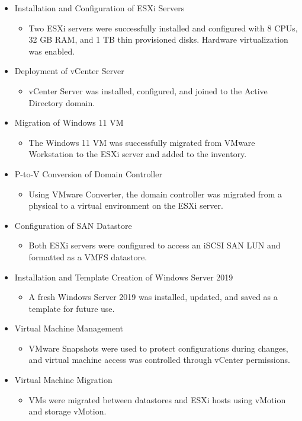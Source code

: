\documentclass[letterpaper]{article}
\begin{document}
\begin{itemize}
\item Installation and Configuration of ESXi Servers
\begin{itemize}
\item Two ESXi servers were successfully installed and configured with 8 CPUs, 32 GB RAM, and 1 TB thin provisioned disks. Hardware virtualization was enabled.
\end{itemize}
\item Deployment of vCenter Server
\begin{itemize}
\item vCenter Server was installed, configured, and joined to the Active Directory domain.
\end{itemize}
\item Migration of Windows 11 VM
\begin{itemize}
\item The Windows 11 VM was successfully migrated from VMware Workstation to the ESXi server and added to the inventory.
\end{itemize}
\item P-to-V Conversion of Domain Controller
\begin{itemize}
\item Using VMware Converter, the domain controller was migrated from a physical to a virtual environment on the ESXi server.
\end{itemize}
\item Configuration of SAN Datastore
\begin{itemize}
\item Both ESXi servers were configured to access an iSCSI SAN LUN and formatted as a VMFS datastore.
\end{itemize}
\item Installation and Template Creation of Windows Server 2019
\begin{itemize}
\item A fresh Windows Server 2019 was installed, updated, and saved as a template for future use.
\end{itemize}
\item Virtual Machine Management
\begin{itemize}
\item VMware Snapshots were used to protect configurations during changes, and virtual machine access was controlled through vCenter permissions.
\end{itemize}
\item Virtual Machine Migration
\begin{itemize}
\item VMs were migrated between datastores and ESXi hosts using vMotion and storage vMotion.
\end{itemize}
\end{itemize}
\end{document}
